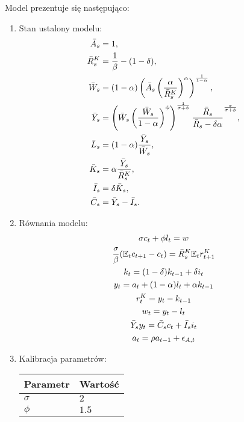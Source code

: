 Model prezentuje się następująco:
\begin{enumerate}
    \item Stan ustalony modelu:
        \begin{align}
                \bar{A}_s &= 1, \\
                \bar{R}_s^K &= \frac{1}{\beta} - (1 - \delta), \\
                \bar{W}_s &= (1-\alpha)\left(\bar{A}_s \left(\frac{\alpha}{\bar{R}_s^{K}}\right)^\alpha\right)^{\frac{1}{1-\alpha}}, \\
                \bar{Y}_s &= \left( \bar{W}_s \left( \frac{\bar{W}_s}{1-\alpha}\right)^\phi\right)^{\frac{1}{\sigma + \phi}} \frac{\bar{R}_s}{\bar{R}_s - \delta \alpha}^{\frac{\sigma}{\sigma + \phi}}, \\
                \bar{L}_s &= (1-\alpha)\frac{\bar{Y}_s}{\bar{W}_s}, \\
                \bar{K}_s &= \alpha\frac{\bar{Y}_s}{\bar{R}_s^K},\\
                \bar{I}_s &= \delta \bar{K}_s, \\
                \bar{C}_s &= \bar{Y}_s - \bar{I}_s.
        \end{align}
    \item Równania modelu:
    \begin{gather}
        \sigma c_{t} + \phi l_t = w \\
        \frac{\sigma}{\beta} (\mathbb{E}_t c_{t+1} - c_t) = \bar{R}_s^K \mathbb{E}_t r^K_{t+1} \\
        k_t = (1 - \delta) k_{t-1} + \delta i_t \\ 
        y_t = a_t + (1-\alpha) l_t + \alpha k_{t-1} \\
        r^K_t = y_t - k_{t-1}   \\
        w_t = y_t - l_t \\
        \bar{Y}_s y_t = \bar{C}_s c_t + \bar{I}_s i_t \\
        a_t = \rho a_{t-1} + \epsilon_{A,t}
    \end{gather}
    \item Kalibracja parametrów:
        \begin{center}
            \begin{tabular}{|p{}|p{}|}
                \hline
                Parametr & Wartość \\
                \hline 
                $\sigma$ & $2$\\
                $\phi$ & $1.5$ \\

\end{tabular}
\end{center}
\end{enumerate}
